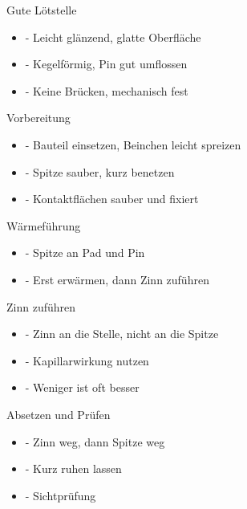 \begin{frame}{Gute Lötstelle}
\begin{itemize}\setlength{\itemsep}{3mm}
    \item - Leicht glänzend, glatte Oberfläche
    \item - Kegelförmig, Pin gut umflossen
    \item - Keine Brücken, mechanisch fest
\end{itemize}
\end{frame}

\begin{frame}{Vorbereitung}
\begin{itemize}\setlength{\itemsep}{3mm}
    \item - Bauteil einsetzen, Beinchen leicht spreizen
    \item - Spitze sauber, kurz benetzen
    \item - Kontaktflächen sauber und fixiert
\end{itemize}
\end{frame}

\begin{frame}{Wärmeführung}
\begin{itemize}\setlength{\itemsep}{3mm}
    \item - Spitze an Pad und Pin
    \item - Erst erwärmen, dann Zinn zuführen
\end{itemize}
\end{frame}

\begin{frame}{Zinn zuführen}
\begin{itemize}\setlength{\itemsep}{3mm}
    \item - Zinn an die Stelle, nicht an die Spitze
    \item - Kapillarwirkung nutzen
    \item - Weniger ist oft besser
\end{itemize}
\end{frame}

\begin{frame}{Absetzen und Prüfen}
\begin{itemize}\setlength{\itemsep}{3mm}
    \item - Zinn weg, dann Spitze weg
    \item - Kurz ruhen lassen
    \item - Sichtprüfung
\end{itemize}
\end{frame}

